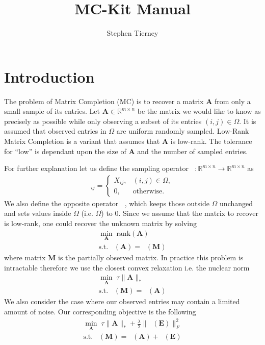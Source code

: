 \documentclass{article}
\DeclareMathOperator*{\pro}{\mathcal P_{\Omega}}
\DeclareMathOperator*{\pron}{\mathcal P_{\bar{\Omega}}}
\begin{document}
\title{MC-Kit Manual}
\author{Stephen Tierney}
\maketitle

\section{Introduction}

The problem of Matrix Completion (MC) is to recover a matrix $\mathbf A$ from only a small sample of its entries. Let $\mathbf A \in \mathbb R^{m \times n}$  be the matrix we would like to know as precisely as possible while only observing a subset of its entries $(i, j) \in \Omega$. It is assumed that observed entries in $\Omega$ are uniform randomly sampled. Low-Rank Matrix Completion is a variant that assumes that $\mathbf A$ is low-rank. The tolerance for ``low'' is dependant upon the size of $\mathbf A$ and the number of sampled entries. 

For further explanation let us define the sampling operator $\pro : \mathbb R^{m \times n} \rightarrow \mathbb R^{m \times n}$ as
\begin{align}
[ \pro  ( X ) ]_{ij} = \left\{
\begin{array}{ll}
X_{ij}, &(i, j) \in \Omega,\\
0, &\text{otherwise}.
\end{array}
\right.
\end{align}
We also define the opposite operator $\pron$, which keeps those outside $\Omega$ unchanged and sets values inside $\Omega$ (i.e. $\bar{\Omega}$) to $0$. Since we assume that the matrix to recover is low-rank, one could recover the unknown matrix by solving
\begin{align}
\min_{\mathbf A} \; \text{rank}(\mathbf A)\\
\text{s.t.} \; \pro  (\mathbf A) = \pro (\mathbf M) \nonumber 
\end{align}
where matrix $\mathbf M$ is the partially observed matrix. In practice this problem is intractable therefore we use the closest convex relaxation i.e. the nuclear norm
\begin{align}
\min_{\mathbf A} \; \tau \| \mathbf A \|_* \\
\text{s.t.} \; \pro (\mathbf M) = \pro (\mathbf A) \nonumber 
\end{align}
We also consider the case where our observed entries may contain a limited amount of noise. Our corresponding objective is the following
\begin{align}
\min_{\mathbf A} \; \tau \| \mathbf A \|_* + \frac{\lambda}{2} \| \pro (\mathbf E) \|_F^2\\
\text{s.t.} \; \pro (\mathbf M) = \pro (\mathbf A) + \pro (\mathbf E) \nonumber 
\end{align}
\end{document}
